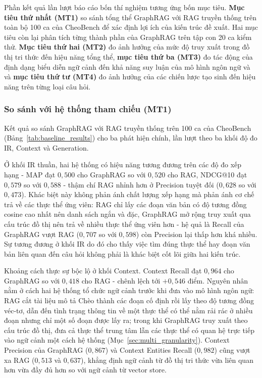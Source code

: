 Phần kết quả lần lượt báo cáo bốn thí nghiệm tương ứng bốn mục tiêu. \textbf{Mục tiêu thứ nhất (MT1)} so sánh tổng thể GraphRAG với RAG truyền thống trên toàn bộ 100 ca của CheoBench để xác định lợi ích của kiến trúc đề xuất. Hai mục tiêu còn lại phân tích từng thành phần của GraphRAG trên tập con 20 ca kiểm thử. \textbf{Mục tiêu thứ hai (MT2)} đo ảnh hưởng của mức độ truy xuất trong đồ thị tri thức đến hiệu năng tổng thể, \textbf{mục tiêu thứ ba (MT3)} đo tác động của định dạng biểu diễn ngữ cảnh đến khả năng suy luận của mô hình ngôn ngữ và và \textbf{mục tiêu thứ tư (MT4)} đo ảnh hưởng của các chiến lược tạo sinh đến hiệu năng trên từng loại câu hỏi.

\subsubsection{So sánh với hệ thống tham chiếu (MT1)}
\label{sec:results_baseline}

Kết quả so sánh GraphRAG với RAG truyền thống trên 100 ca của CheoBench (Bảng~\ref{tab:baseline_results}) cho ba phát hiện chính, lần lượt theo ba khối độ đo IR, Context và Generation.

Ở khối IR thuần, hai hệ thống có hiệu năng tương đương trên các độ đo xếp hạng - MAP đạt $0,500$ cho GraphRAG so với $0,520$ cho RAG, NDCG@10 đạt $0,579$ so với $0,588$ - thậm chí RAG nhỉnh hơn ở Precision tuyệt đối ($0,628$ so với $0,473$). Khác biệt này không phản ánh chất lượng xếp hạng mà phản ánh cơ chế trả về các thực thể ứng viên: RAG chỉ lấy các đoạn văn bản có độ tương đồng cosine cao nhất nên danh sách ngắn và đặc, GraphRAG mở rộng truy xuất qua cấu trúc đồ thị nên trả về nhiều thực thể ứng viên hơn - hệ quả là Recall của GraphRAG vượt RAG ($0,707$ so với $0,598$) còn Precision lại thấp hơn khá nhiều. Sự tương đương ở khối IR do đó cho thấy việc tìm đúng thực thể hay đoạn văn bản liên quan đến câu hỏi không phải là khác biệt cốt lõi giữa hai kiến trúc.

Khoảng cách thực sự bộc lộ ở khối Context. Context Recall đạt $0,964$ cho GraphRAG so với $0,418$ cho RAG - chênh lệch tới $+0,546$ điểm. Nguyên nhân nằm ở cách hai hệ thống tổ chức ngữ cảnh trước khi đưa vào mô hình ngôn ngữ: RAG cắt tài liệu mô tả Chèo thành các đoạn cố định rồi lấy theo độ tương đồng véc-tơ, dẫn đến tình trạng thông tin về một thực thể có thể nằm rải rác ở nhiều đoạn nhưng chỉ một số đoạn được lấy ra; trong khi GraphRAG truy xuất theo cấu trúc đồ thị, đưa cả thực thể trung tâm lẫn các thực thể có quan hệ trực tiếp vào ngữ cảnh một cách hệ thống (Mục~\ref{sec:multi_granularity}). Context Precision của GraphRAG ($0,867$) và Context Entities Recall ($0,982$) cũng vượt xa RAG ($0,513$ và $0,637$), khẳng định ngữ cảnh từ đồ thị tri thức vừa liên quan hơn vừa đầy đủ hơn so với ngữ cảnh từ vector store.

